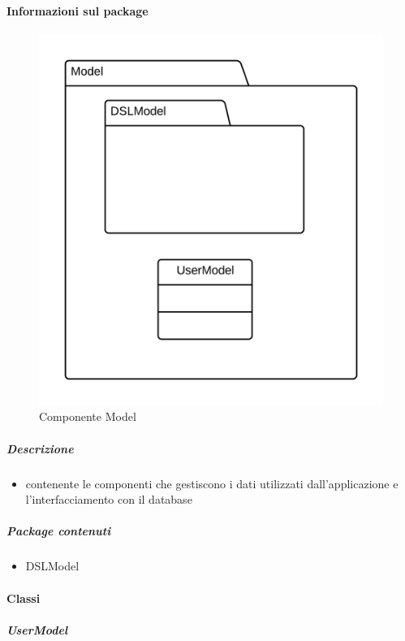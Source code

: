 	\paragraph{Informazioni sul package} 
		\begin{figure}[H] 
			\begin{center} 
				\includegraphics[width=\textwidth]{uml/package/Back-end::Lib::Model.png}  
				\caption{Componente Model}
			\end{center}  
		\end{figure} 
	\subparagraph{Descrizione} 
		\begin{itemize}
		\item[]  contenente le componenti che gestiscono i dati utilizzati dall’applicazione e l’interfacciamento con il
database
		\end{itemize} 
		\subparagraph{Package contenuti} 
		\begin{itemize}
				\item DSLModel
		\end{itemize}
		\paragraph{Classi}
			\subparagraph{UserModel}
				
